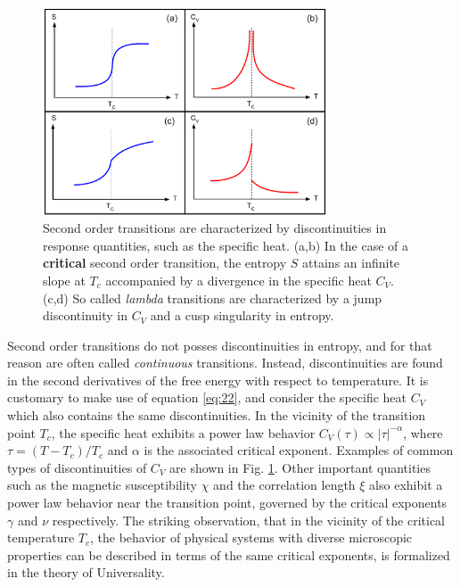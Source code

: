 \documentclass[12pt]{report}
\begin{document}
\newpage

\begin{figure}
\center
\includegraphics[width = 0.75\textwidth]{chapter2Figs/CanonicalSecondOrder.pdf}
\caption{\label{fig:Fig_4}%
Second order transitions are characterized by discontinuities in response quantities, such as the specific heat. (a,b) In the case of a \textbf{critical} second order transition, the entropy $S$ attains an infinite slope at $T_{c}$ accompanied by a divergence in the specific heat $C_{V}$. (c,d) So called \textit{lambda} transitions are characterized by a jump discontinuity in $C_{V}$ and a cusp singularity in entropy.}
\end{figure}

Second order transitions do not posses discontinuities in entropy, and for that reason are often called \textit{continuous} transitions. Instead, discontinuities are found in the second derivatives of the free energy with respect to temperature. It is customary to make use of equation\,\,\ref{eq:22}, and consider the specific heat $C_{V}$ which also contains the same discontinuities.
In the vicinity of the transition point $T_{c}$, the specific heat exhibits a power law behavior $C_{V}(\tau) \propto \left| \tau \right|^{-\alpha}$, where $\tau = \left(T-T_{c}\right)/T_{c}$ and $\alpha$ is the associated critical exponent. Examples of common types of discontinuities of $C_{V}$ are shown in Fig. \ref{fig:Fig_4}. Other important quantities such as the magnetic susceptibility $\chi$ and the correlation length $\xi$ also exhibit a power law behavior near the transition point, governed by the critical exponents $\gamma$ and $\nu$ respectively. The striking observation, that in the vicinity of the critical temperature $T_{c}$, the behavior of physical systems with diverse microscopic properties can be described in terms of the same critical exponents, is formalized in the theory of Universality\cite{Kardar2009}. 
\end{document}
